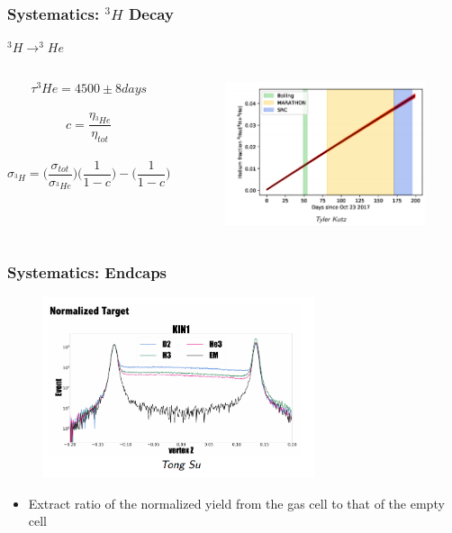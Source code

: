 \documentclass{beamer}
\begin{document}
\begin{frame}
\frametitle{Systematics: $^3H $ Decay}
	\begin{block}{$^3H \rightarrow ^3He$}
		\begin{columns}
			\begin{equation*}
			 	\tau^3He = 4500 \pm 8 days
			 \end{equation*}		 	
			 \\
			 \begin{equation*}
			 	c = \frac{\eta_{^3He}} {\eta_{tot}}
			 \end{equation*}
			 \\
 			 \begin{equation*}
				 \sigma_{^3H} = \big(\frac{\sigma_{tot}}{\sigma_{^3He}}\big) \big(\frac{1}{1-c}\big) -  \big(\frac{1}{1-c}\big)  
			 \end{equation*}
		 	\begin{figure}
			 	\includegraphics[width=6cm]{../images/beta_decay.png}
			 \end{figure}
		\end{columns}
	\end{block}
\end{frame}



\begin{frame}
\frametitle{Systematics: Endcaps}
	\vspace{-10pt}
\begin{block}{}
	\begin{figure}
		\includegraphics[width=8cm]{../images/em_tgt_comp.png}
	\end{figure}

\begin{itemize}
	\item Extract ratio of the normalized yield from the gas cell to that of the empty cell
\end{itemize}

\end{block}
\end{frame}
\end{document}
